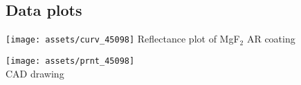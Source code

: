 \documentclass{article}
\begin{document}
\begin{multicols}{2}
\section{Data plots}

\begin{center}
\texttt{[image: assets/curv\_45098]}
Reflectance plot of MgF$_{2}$ AR coating
\end{center}


\end{multicols}

\begin{center}
\texttt{[image: assets/prnt\_45098]}
\\CAD drawing
\end{center}
\end{document}
